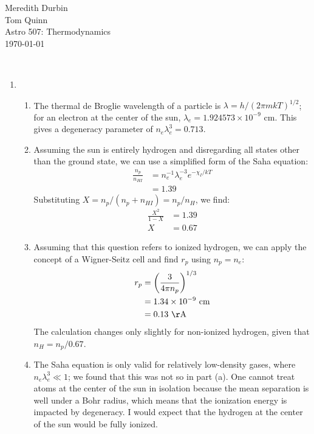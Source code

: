 \documentclass[11pt]{article}
\begin{document}
\begin{flushright}Meredith Durbin\\
Tom Quinn\\
Astro 507: Thermodynamics\\
\today\\

\end{flushright}

 \\[6pt]

\begin{enumerate}

\item
	\begin{enumerate}
    \item The thermal de Broglie wavelength of a particle is $\lambda = h/(2\pi mkT)^{1/2}$; for an electron at the center of the sun, $\lambda_e = 1.924573 \times 10^{-9}$ cm. This gives a degeneracy parameter of $n_e\lambda_e^3 = 0.713$.
    
    \item Assuming the sun is entirely hydrogen and disregarding all states other than the ground state, we can use a simplified form of the Saha equation:
    \begin{align}
    \frac{n_p}{n_{HI}} &= n_e^{-1} \lambda_e^{-3} e^{-\chi_I/kT} \\
    &= 1.39
    \end{align}
    Substituting $X = n_p/(n_p + n_{HI}) = n_p/n_H$, we find:
    \begin{align}
    \frac{X^2}{1 - X} &= 1.39 \\
    X &= 0.67
    \end{align}
    \item Assuming that this question refers to ionized hydrogen, we can apply the concept of a Wigner-Seitz cell and find $r_p$ using $n_p = n_e$:
    \begin{align}
    r_p &= \left( \frac{3}{4\pi n_p} \right)^{1/3} \\
    &= 1.34 \times 10^{-9} \mathrm{\ cm} \\
    &= 0.13 \mathrm{\ \AA}
    \end{align}
    The calculation changes only slightly for non-ionized hydrogen, given that $n_H = n_p/0.67$.
    \item The Saha equation is only valid for relatively low-density gases, where $n_e\lambda_e^3 \ll 1$; we found that this was not so in part (a). One cannot treat atoms at the center of the sun in isolation because the mean separation is well under a Bohr radius, which means that the ionization energy is impacted by degeneracy. I would expect that the hydrogen at the center of the sun would be fully ionized.
    \end{enumerate}

\end{enumerate}
\end{document}
